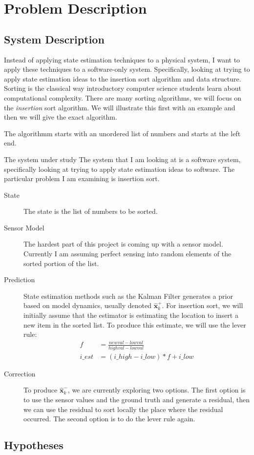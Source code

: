 \section{Problem Description} \label{sec:problem}


\subsection{System Description}

Instead of applying state estimation techniques to a physical system,
I want to apply these techniques to a software-only
system. Specifically, looking at trying to apply state estimation
ideas to the insertion sort algorithm and data structure. Sorting is
the classical way introductory computer science students learn about
computational complexity. There are many sorting algorithms, we will
focus on the \textit{insertion} sort algorithm. We will illustrate this first
with an example and then we will give the exact algorithm. 

The algorithmm starts with an unordered list of numbers and starts at
the left end.



The system under study
The system that I am looking at is a software system, specifically
looking at trying to apply state estimation ideas to software. The
particular problem I am examining is insertion sort.

\begin{description}
\item[State] The state is the list of numbers to be sorted.
\item[Sensor Model] The hardest part of this project is coming up with a
  sensor model. Currently I am assuming perfect sensing into random
  elements of the sorted portion of the list.
\item[Prediction] State estimation methods such as the Kalman Filter
  generates a prior based on model dynamics, usually denoted $
  \hat{\mathbf{x}}_{k}^{+}$. For insertion sort, we will initially
  assume that the estimator is estimating the location to insert a new item
  in the sorted list. To produce this estimate, we will use the lever
  rule:
  \begin{align}
    f &= \frac{newval - lowval}{highval - lowval} \\
    i\_est &= (i\_high - i\_low)*f + i\_low
  \end{align}  
\item[Correction] To produce $\hat{\mathbf{x}}_{k}^{-}$, we are
  currently exploring two options. The first option is to use the
  sensor values and the ground truth and generate a residual, then we
  can use the residual to sort locally the place where the residual
  occurred. The second option is to do the lever rule again.
\end{description}

\subsection{Hypotheses} \label{subsec:hypo}

